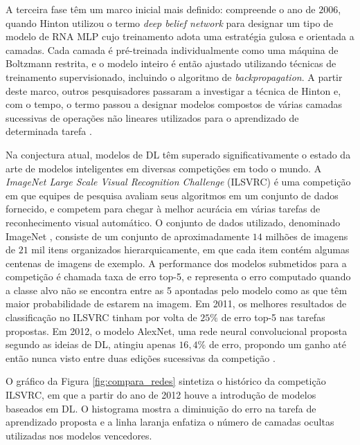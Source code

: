 A terceira fase têm um marco inicial mais definido: compreende o ano de $2006$, quando Hinton utilizou o termo \emph{deep belief network} para designar um tipo de modelo de RNA MLP cujo treinamento adota uma estratégia gulosa e orientada a camadas. Cada camada é pré-treinada individualmente como uma máquina de Boltzmann restrita, e o modelo inteiro é então ajustado utilizando técnicas de treinamento supervisionado, incluindo o algoritmo de \emph{backpropagation}. A partir deste marco, outros pesquisadores passaram a investigar a técnica de Hinton e, com o tempo, o termo passou a designar modelos compostos de várias camadas sucessivas de operações não lineares utilizados para o aprendizado de determinada tarefa \cite{hinton2006fast, hinton2007learning, goodfellow2016deep, deng2014deep}.

Na conjectura atual, modelos de DL têm superado significativamente o estado da arte de modelos inteligentes em diversas competições em todo o mundo. A \emph{ImageNet Large Scale Visual Recognition Challenge} (ILSVRC) \cite{ImagenetChall} é uma competição em que equipes de pesquisa avaliam seus algoritmos em um conjunto de dados fornecido, e competem para chegar à melhor acurácia em várias tarefas de reconhecimento visual automático. O conjunto de dados utilizado, denominado ImageNet \cite{Imagenet:main}, consiste de um conjunto de aproximadamente $14$ milhões de imagens de $21$ mil itens organizados hierarquicamente, em que cada item contém algumas centenas de imagens de exemplo. A performance dos modelos submetidos para a competição é chamada taxa de erro top-5, e representa o erro computado quando a classe alvo não se encontra entre as 5 apontadas pelo modelo como as que têm maior probabilidade de estarem na imagem. Em 2011, os melhores resultados de  classificação no ILSVRC tinham por volta de $25\%$ de erro top-5 nas tarefas propostas. Em 2012, o modelo AlexNet, uma rede neural convolucional proposta segundo as ideias de DL, atingiu apenas $16,4\%$ de erro, propondo um ganho até então nunca visto entre duas edições sucessivas da competição \cite{ImagenetChall:2012}.

O gráfico da Figura \ref{fig:compara_redes} sintetiza o histórico da competição ILSVRC, em que a partir do ano de 2012 houve a introdução de modelos baseados em DL. O histograma mostra a diminuição do erro na tarefa de aprendizado proposta e a linha laranja enfatiza o número de camadas ocultas utilizadas nos modelos vencedores.

